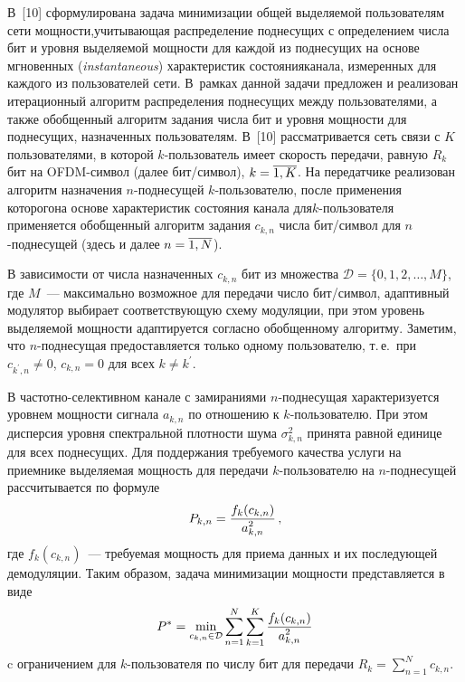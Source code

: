 \begin{multicols}{2}
  В~[10] сформулирована задача минимизации общей выделяемой пользователям сети 
мощ\-ности,\linebreak учитывающая распределение поднесущих с определением числа бит и уровня 
выделяемой мощ\-ности для каждой из поднесущих на основе мгновенных 
(\textit{instantaneous}) характеристик состояния\linebreak канала, измеренных для каждого из 
пользователей сети. В~рамках данной задачи предложен и реализован итерационный 
алгоритм распределения поднесущих между пользователями, а также обобщенный 
алгоритм задания числа бит и уровня мощ\-ности для поднесущих, назначенных 
пользователям. В~[10] рассматривается сеть связи с $K$ пользователями, в которой 
  $k$-поль\-зо\-ва\-тель имеет скорость передачи, равную $R_k$ бит на OFDM-сим\-вол 
(далее бит/символ), $k\hm=\overline{1,K}$. На передатчике реализован алгоритм 
назначения $n$-под\-не\-су\-щей $k$-поль\-зо\-ва\-те\-лю, после применения которого\linebreak на 
основе характеристик состояния канала для\linebreak $k$-поль\-зо\-ва\-те\-ля применяется 
обобщенный алгоритм задания $c_{k,n}$ чис\-ла бит/символ для $n$-под\-не\-су\-щей 
(здесь и далее $n\hm=\overline{1,N}$).
  
  В зависимости от числа назначенных $c_{k,n}$ бит из множества 
$\mathcal{D}=\{0,1,2,\ldots ,M\}$, где $M$~--- максимально возможное для передачи 
число бит/символ, адаптивный модулятор выбирает соответствующую схему модуляции, 
при этом уровень выделяемой мощности адаптируется согласно обобщенному алгоритму. 
Заметим, что $n$-поднесущая предоставляется только одному пользователю, т.\,е.\ при 
$c_{k^\prime,n}\not=0$, $c_{k,n}=0$ для всех $k\not=k^\prime$.
  
  В частотно-селективном канале с замираниями $n$-поднесущая характеризуется 
уровнем мощ\-ности сигнала $a_{k,n}$ по отношению к $k$-пользователю. При этом 
дисперсия уровня спектральной плот\-ности шума $\sigma_{k,n}^2$ принята равной 
единице для всех поднесущих. Для поддержания требуемого качества услуги на 
приемнике выделяемая мощность для передачи $k$-пользователю на $n$-поднесущей 
рассчитывается по формуле 
$$
P_{k,n}=\displaystyle\frac{\displaystyle f_k(c_{k,n})\mathstrut}{\displaystyle a_{k,n}^2\mathstrut}\,,
$$ 
где $f_k(c_{k,n})$~--- 
требуемая мощность для приема данных и их последующей демодуляции. Таким образом, 
задача минимизации мощности представляется в виде 
$$
P^*=\min\limits_{c_{k,n}\in\mathcal{D}}\sum\limits_{n=1}^N \sum\limits_{k=1}^K 
\displaystyle\frac{\displaystyle f_k(c_{k,n})\mathstrut}{\displaystyle a_{k,n}^2\mathstrut}
$$ 
c ограничением для $k$-поль\-зо\-ва\-те\-ля по числу бит для передачи 
$R_k=\sum\limits_{n=1}^N c_{k,n}$.
  

\end{multicols}
